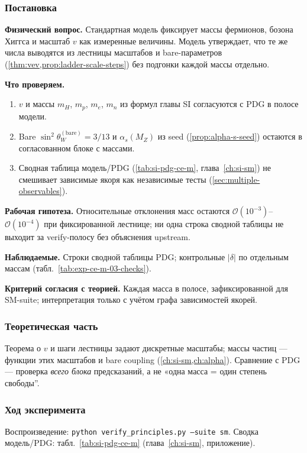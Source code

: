 \label{exp:cem03}

\subsubsection*{Постановка}
\textbf{Физический вопрос.}
Стандартная модель фиксирует массы фермионов, бозона Хиггса и масштаб $v$ как измеренные величины.
Модель утверждает, что те же числа выводятся из лестницы масштабов и bare-параметров (\cref{thm:vev,prop:ladder-scale-steps}) без подгонки каждой массы отдельно.

\textbf{Что проверяем.}
\begin{enumerate}[label=\textbf{(\alph*)},leftmargin=*,itemsep=0.25em]
\item $v$ и массы $m_H$, $m_p$, $m_e$, $m_n$ из формул главы SI согласуются с PDG в полосе модели.
\item Bare $\sin^2\theta_W^{(\mathrm{bare})}=3/13$ и $\alpha_s(M_Z)$ из seed (\cref{prop:alpha-s-seed}) остаются в согласованном блоке с массами.
\item Сводная таблица модель/PDG (\cref{tab:si-pdg-ce-m}, глава~\cref{ch:si-sm}) не смешивает зависимые якоря как независимые тесты (\cref{sec:multiple-observables}).
\end{enumerate}

\textbf{Рабочая гипотеза.}
Относительные отклонения масс остаются $\mathcal{O}(10^{-3})$--$\mathcal{O}(10^{-4})$ при фиксированной лестнице; ни одна строка сводной таблицы не выходит за verify-полосу без объяснения upstream.

\textbf{Наблюдаемые.}
Строки сводной таблицы PDG; контрольные $|\delta|$ по отдельным массам (табл.~\ref{tab:exp-ce-m-03-checks}).

\textbf{Критерий согласия с теорией.}
Каждая масса в полосе, зафиксированной для SM-suite; интерпретация только с учётом графа зависимостей якорей.

\subsubsection*{Теоретическая часть}
Теорема о $v$ и шаги лестницы задают дискретные масштабы; массы частиц --- функции этих масштабов и bare coupling (\cref{ch:si-sm,ch:alpha}).
Сравнение с PDG --- проверка \emph{всего блока} предсказаний, а не «одна масса = один степень свободы''.

\subsubsection*{Ход эксперимента}
Воспроизведение: \texttt{python verify\_principles.py --suite sm}.
Сводка модель/PDG: табл.~\ref{tab:si-pdg-ce-m} (глава~\cref{ch:si-sm}, приложение).

